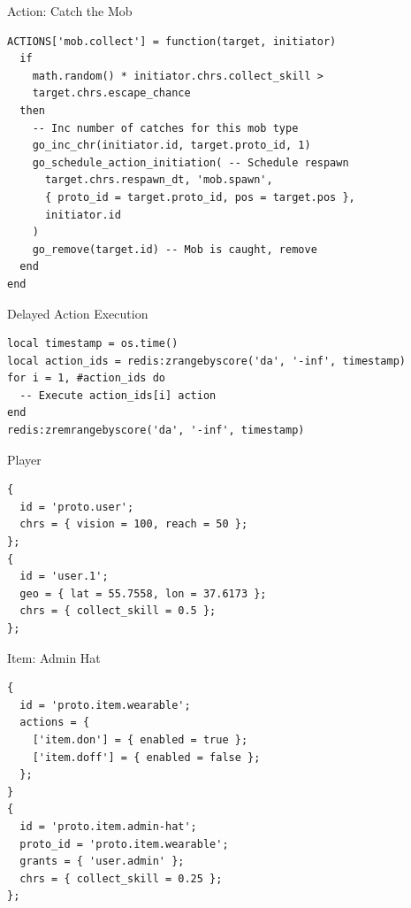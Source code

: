 \documentclass[aspectratio=169,handout,bigger]{beamer}
\begin{document}

\begin{frame}[fragile]{Action: Catch the Mob}
\begin{verbatim}
ACTIONS['mob.collect'] = function(target, initiator)
  if
    math.random() * initiator.chrs.collect_skill >
    target.chrs.escape_chance
  then
    -- Inc number of catches for this mob type
    go_inc_chr(initiator.id, target.proto_id, 1)
    go_schedule_action_initiation( -- Schedule respawn
      target.chrs.respawn_dt, 'mob.spawn',
      { proto_id = target.proto_id, pos = target.pos },
      initiator.id
    )
    go_remove(target.id) -- Mob is caught, remove
  end
end
\end{verbatim}
\end{frame}


\begin{frame}[fragile]{Delayed Action Execution}
\begin{verbatim}
local timestamp = os.time()
local action_ids = redis:zrangebyscore('da', '-inf', timestamp)
for i = 1, #action_ids do
  -- Execute action_ids[i] action
end
redis:zremrangebyscore('da', '-inf', timestamp)
\end{verbatim}
\end{frame}


\begin{frame}[fragile]{Player}
\begin{verbatim}
{
  id = 'proto.user';
  chrs = { vision = 100, reach = 50 };
};
{
  id = 'user.1';
  geo = { lat = 55.7558, lon = 37.6173 };
  chrs = { collect_skill = 0.5 };
};
\end{verbatim}
\end{frame}


\begin{frame}[fragile]{Item: Admin Hat}
\begin{verbatim}
{
  id = 'proto.item.wearable';
  actions = {
    ['item.don'] = { enabled = true };
    ['item.doff'] = { enabled = false };
  };
}
{
  id = 'proto.item.admin-hat';
  proto_id = 'proto.item.wearable';
  grants = { 'user.admin' };
  chrs = { collect_skill = 0.25 };
};
\end{verbatim}
\end{frame}
\end{document}
